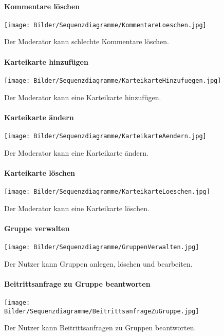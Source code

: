 \documentclass[12pt,a4paper]{article}
\begin{document}
\begin{figure}[H]
	\centering
	\paragraph{Kommentare löschen}
	\texttt{[image: Bilder/Sequenzdiagramme/KommentareLoeschen.jpg]}
	\caption{Der Moderator kann schlechte Kommentare löschen.}
	\label{SzKommentarLoeschen}
\end{figure}
\begin{figure}[H]
	\centering
	\paragraph{Karteikarte hinzufügen}
	\texttt{[image: Bilder/Sequenzdiagramme/KarteikarteHinzufuegen.jpg]}
	\caption{Der Moderator kann eine Karteikarte hinzufügen.}
	\label{SzKarteikarteHinzufuegen}
\end{figure}
\begin{figure}[H]
	\centering
	\paragraph{Karteikarte ändern}
	\texttt{[image: Bilder/Sequenzdiagramme/KarteikarteAendern.jpg]}
	\caption{Der Moderator kann eine Karteikarte ändern.}
	\label{SzKarteikarteAendern}
\end{figure}
\begin{figure}[H]
	\centering
	\paragraph{Karteikarte löschen}
	\texttt{[image: Bilder/Sequenzdiagramme/KarteikarteLoeschen.jpg]}
	\caption{Der Moderator kann eine Karteikarte löschen.}
	\label{SzKarteikarteLoeschen}
\end{figure}
\begin{figure}[H]
	\centering
	\paragraph{Gruppe verwalten}
	\texttt{[image: Bilder/Sequenzdiagramme/GruppenVerwalten.jpg]}
	\caption{Der Nutzer kann Gruppen anlegen, löschen und bearbeiten.}
	\label{SzGruppenVerwalten}
\end{figure}
\begin{figure}[H]
	\centering
	\paragraph{Beitrittsanfrage zu Gruppe beantworten}
	\texttt{[image: Bilder/Sequenzdiagramme/BeitrittsanfrageZuGruppe.jpg]}
	\caption{Der Nutzer kann Beitrittsanfragen zu Gruppen beantworten.}
	\label{SzBeitrittsanfrageZuGruppe}
\end{figure}
\end{document}
